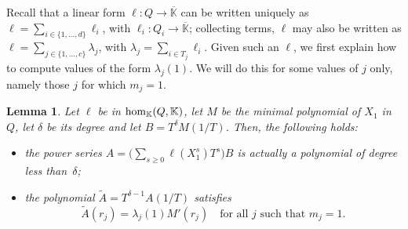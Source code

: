 \documentclass[12pt]{article}
\newtheorem{Lemma}{Lemma}
\def\K {\ensuremath{\mathbb{K}}}
\def\Kbar {{\ensuremath{\overline{\mathbb{K}}}}}
\def\K{\mathbb{K}}
\begin{document}
Recall that a linear form $\ell: Q \to \Kbar$ can be written uniquely
as $\ell=\sum_{i\in \{1,\dots,d\}} \ell_i$, with $\ell_i:Q_i \to
\Kbar$; collecting terms, $\ell$ may also be written as $\ell=\sum_{j
	\in \{1,\dots,c\}} \lambda_j$, with $\lambda_j=\sum_{i \in T_j}
\ell_i$.  Given such an $\ell$, we first explain how to compute values
of the form $\lambda_j(1)$. We will do this for some values of $j$
only, namely those $j$ for which $m_j=1$.

\begin{Lemma}\label{lemma:valuelambda}
	Let $\ell$ be in ${\rm hom}_\K(Q,\K)$, let $M$ be the minimal
	polynomial of $X_1$ in $Q$, let $\delta$ be its degree and 
	let $B=T^{\delta}M(1/T)$. Then, the following holds:
	\begin{itemize}
		\item the power series $A = \Big(\sum_{s \ge 0}
		\ell(X_1^s)T^s\Big)B$ is actually a polynomial of degree less than~$\delta$;
		\item the polynomial $\tilde A = T^{\delta-1} A(1/T)$ satisfies
		$$\tilde A(r_j) = \lambda_j(1) M'(r_j) \quad \text{for all $j$ such that $m_j=1$.}$$
	\end{itemize}
\end{Lemma}
\end{document}
